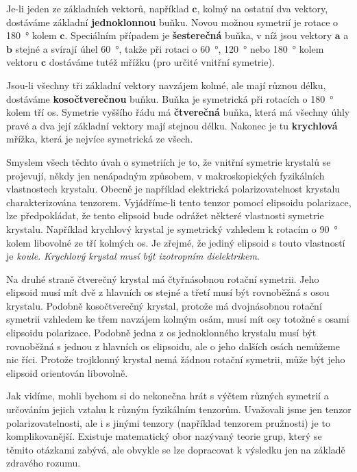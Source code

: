    Je-li jeden ze základních vektorů, například \(\bm{c}\), kolmý na ostatní dva vektory, 
    dostáváme základní \textbf{jednoklonnou} buňku. Novou možnou symetrií je rotace o 
    \SI{180}{\degree} kolem \(\bm{c}\). Speciálním případem je \textbf{šesterečná} buňka, v níž 
    jsou vektory \(\bm{a}\) a \(\bm{b}\) stejné a svírají úhel \SI{60}{\degree}, takže při rotaci o 
    \SI{60}{\degree}, \SI{120}{\degree} nebo \SI{180}{\degree} kolem vektoru \(\bm{c}\) dostáváme 
    tutéž mřížku (pro určité vnitřní symetrie).
    
    Jsou-li všechny tři základní vektory navzájem kolmé, ale mají různou délku, dostáváme 
    \textbf{kosočtverečnou} buňku. Buňka je symetrická při rotacích o \SI{180}{\degree} kolem tří 
    os. Symetrie vyššího řádu má \textbf{čtverečná} buňka, která má všechny úhly pravé a dva její 
    základní vektory mají stejnou délku. Nakonec je tu \textbf{krychlová} mřížka, která je nejvíce 
    symetrická ze všech.
    
    Smyslem všech těchto úvah o symetriích je to, že vnitřní symetrie krystalů se projevují, někdy 
    jen nenápadným způsobem, v makroskopických fyzikálních vlastnostech krystalu. Obecně je 
    například elektrická polarizovatelnost krystalu charakterizována tenzorem. Vyjádříme-li tento 
    tenzor pomocí elipsoidu polarizace, lze předpokládat, že tento elipsoid bude odrážet některé 
    vlastnosti symetrie krystalu. Například krychlový krystal je symetrický vzhledem k rotacím o 
    \SI{90}{\degree} kolem libovolné ze tří kolmých os. Je zřejmé, že jediný elipsoid s touto 
    vlastností je \emph{koule}. \emph{Krychlový krystal musí být izotropním dielektrikem}.
    
    Na druhé straně čtverečný krystal má čtyřnásobnou rotační symetrii. Jeho elipsoid musí mít dvě 
    z hlavních os stejné a třetí musí být rovnoběžná s osou krystalu. Podobně kosočtverečný 
    krystal, protože má dvojnásobnou rotační symetrii vzhledem ke třem navzájem kolmým osám, musí 
    mít osy totožné s osami elipsoidu polarizace. Podobně jedna z os jednoklonného krystalu musí 
    být rovnoběžná s jednou z hlavních os elipsoidu, ale o jeho dalších osách nemůžeme nic říci. 
    Protože trojklonný krystal nemá žádnou rotační symetrii, může být jeho elipsoid orientován 
    libovolně.
    
    Jak vidíme, mohli bychom si do nekonečna hrát s výčtem různých symetrií a určováním jejich 
    vztahu k různým fyzikálním tenzorům. Uvažovali jsme jen tenzor polarizovatelnosti, ale i s 
    jinými tenzory (například tenzorem pružnosti) je to komplikovanější. Existuje matematický obor 
    nazývaný teorie grup, který se těmito otázkami zabývá, ale obvykle se lze dopracovat k výsledku 
    jen na základě zdravého rozumu.
    
